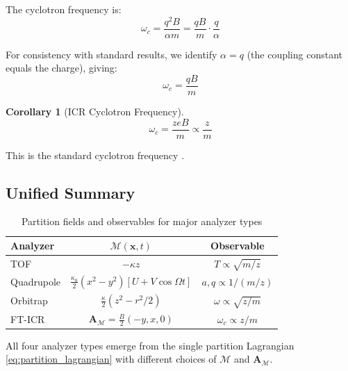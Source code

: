 \documentclass[twocolumn,10pt,a4paper]{article}
\newtheorem{corollary}[theorem]{Corollary}
\theoremstyle{definition}
\theoremstyle{remark}
\newcommand{\Mdepth}{\mathcal{M}}
\newcommand{\Apartition}{\mathbf{A}_{\mathcal{M}}}
\begin{document}
The cyclotron frequency is:
\begin{equation}
    \omega_c = \frac{q^2 B}{\alpha m} = \frac{qB}{m} \cdot \frac{q}{\alpha}
    \label{eq:cyclotron_freq}
\end{equation}

For consistency with standard results, we identify $\alpha = q$ (the coupling constant equals the charge), giving:
\begin{equation}
    \omega_c = \frac{qB}{m}
    \label{eq:cyclotron_standard}
\end{equation}

\begin{corollary}[ICR Cyclotron Frequency]
\begin{equation}
    \boxed{\omega_c = \frac{zeB}{m} \propto \frac{z}{m}}
\end{equation}
\end{corollary}

This is the standard cyclotron frequency \citep{marshall1998}.

\subsection{Unified Summary}

\begin{table}[h]
\centering
\caption{Partition fields and observables for major analyzer types}
\label{tab:analyzers}
\begin{tabular}{lcc}
\toprule
\textbf{Analyzer} & \textbf{$\Mdepth(\mathbf{x}, t)$} & \textbf{Observable} \\
\midrule
TOF & $-\kappa z$ & $T \propto \sqrt{m/z}$ \\
Quadrupole & $\frac{\kappa_0}{2}(x^2-y^2)[U+V\cos\Omega t]$ & $a, q \propto 1/(m/z)$ \\
Orbitrap & $\frac{\kappa}{2}(z^2 - r^2/2)$ & $\omega \propto \sqrt{z/m}$ \\
FT-ICR & $\Apartition = \frac{B}{2}(-y, x, 0)$ & $\omega_c \propto z/m$ \\
\bottomrule
\end{tabular}
\end{table}

All four analyzer types emerge from the single partition Lagrangian \eqref{eq:partition_lagrangian} with different choices of $\Mdepth$ and $\Apartition$.
\end{document}
